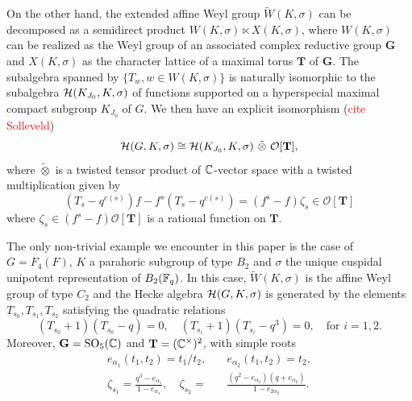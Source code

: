 On the other hand, the extended affine Weyl group $\tilde{W}(K,\sigma)$ can be decomposed as a semidirect product $W(K,\sigma)\ltimes X(K,\sigma)$, where $W(K,\sigma)$ can be realized as the Weyl group of an associated complex reductive group $\mathbf{G}$ and $X(K,\sigma)$ as the character lattice of a maximal torus $\mathbf{T}$ of $\mathbf{G}$. The subalgebra spanned by $\{T_w, w\in W(K,\sigma)\}$ is naturally isomorphic to the subalgebra $\mathcal{H}(K_{J_0},K,\sigma)$ of functions supported on a hyperspecial maximal compact subgroup $K_{J_0}$ of $G$. We then have an explicit isomorphism (\textcolor{red}{cite Solleveld})
\begin{equation}
    \cH(G,K,\sigma)\cong\cH(K_{J_0},K,\sigma)\ \tilde\otimes\ \mathcal{O}[\mathbf{T}],
\end{equation}
where $\tilde\otimes$ is a twisted tensor product of $\mathbb{C}$-vector space with a twisted multiplication given by 
$$(T_s-q^{c(s)})f-f^{s}(T_s-q^{c(s)})=(f^s-f)\zeta_s\in\mathcal{O}[\mathbf{T}]$$
where $\zeta_s\in(f^s-f)\mathcal{O}[\mathbf{T}]$ is a rational function on $\mathbf{T}$. 
\begin{example}\label{ex:F4_B2_algebra}
    The only non-trivial example we encounter in this paper is the case of $G=F_4(F)$, $K$ a parahoric subgroup of type $B_2$ and $\sigma$ the unique cuspidal unipotent representation of $B_2(\mathbb{F}_q)$. In this case, $\tilde{W}(K,\sigma)$ is the affine Weyl group of type $C_2$ and the Hecke algebra $\mathcal{H}(G,K,\sigma)$ is generated by the elements $T_{s_0}, T_{s_1}, T_{s_2}$ satisfying the quadratic relations
    $$(T_{s_0}+1)(T_{s_0}-q)=0,\quad (T_{s_i}+1)(T_{s_i}-q^{3})=0,\quad\text{for }i=1,2.$$
    Moreover, $\mathbf{G}=\mathrm{SO}_5(\mathbb{C})$ and $\mathbf{T}=(\mathbb{C}^\times)^2$, with simple roots 
    \begin{align*}
        e_{\alpha_1}(t_1,t_2)=t_1/t_2,\quad &e_{\alpha_2}(t_1,t_2)=t_2,\\
        \zeta_{s_1}=\frac{q^3-e_{\alpha_1}}{1-e_{\alpha_1}},\quad \zeta_{s_2}=&\frac{(q^2-e_{\alpha_2})(q+e_{\alpha_2})}{1-e_{2\alpha_2}}.
    \end{align*}
\end{example}

